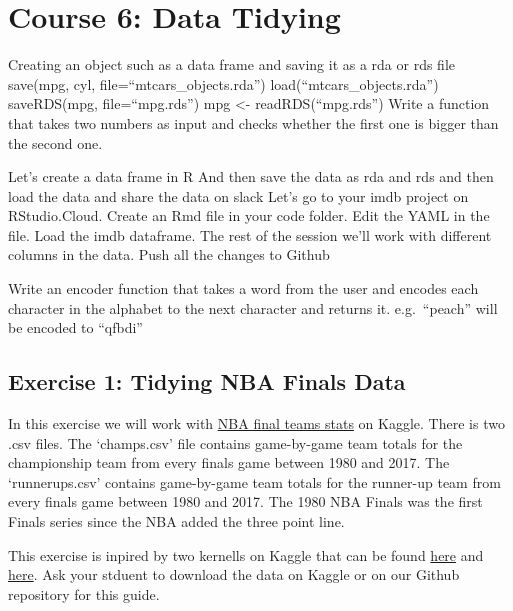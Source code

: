 \documentclass[]{book}
\begin{document}
\hypertarget{tidying}{%
\chapter*{Course 6: Data Tidying}\label{tidying}}

Creating an object such as a data frame and saving it as a rda or rds file
save(mpg, cyl, file=``mtcars\_objects.rda'')
load(``mtcars\_objects.rda'')
saveRDS(mpg, file=``mpg.rds'')
mpg \textless{}- readRDS(``mpg.rds'')
Write a function that takes two numbers as input and checks whether the first one is bigger than the second one.

Let's create a data frame in R
And then save the data as rda and rds and then load the data and share the data on slack
Let's go to your imdb project on RStudio.Cloud. Create an Rmd file in your code folder.
Edit the YAML in the file.
Load the imdb dataframe. The rest of the session we'll work with different columns in the data.
Push all the changes to Github

Write an encoder function that takes a word from the user and encodes each character in the alphabet to the next character and returns it. e.g.~``peach'' will be encoded to ``qfbdi''

\hypertarget{exercise-1-tidying-nba-finals-data}{%
\section*{Exercise 1: Tidying NBA Finals Data}\label{exercise-1-tidying-nba-finals-data}}

In this exercise we will work with \href{https://www.kaggle.com/daverosenman/nba-finals-team-stats}{NBA final teams stats} on Kaggle. There is two .csv files. The `champs.csv' file contains game-by-game team totals for the championship team from every finals game between 1980 and 2017. The `runnerups.csv' contains game-by-game team totals for the runner-up team from every finals game between 1980 and 2017. The 1980 NBA Finals was the first Finals series since the NBA added the three point line.

This exercise is inpired by two kernells on Kaggle that can be found \href{https://www.kaggle.com/carterallen/nba-championship-data}{here} and \href{https://www.kaggle.com/daverosenman/nba-finals-three-point-stats-1980-2017}{here}. Ask your stduent to download the data on Kaggle or on our Github repository for this guide.
\end{document}
